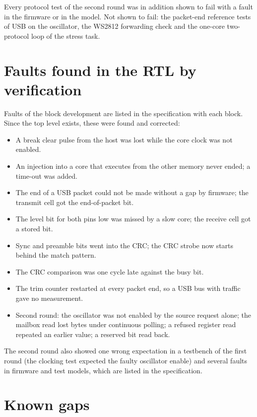 \documentclass[10pt,a4paper]{article}
\begin{document}
Every protocol test of the second round was in addition shown to fail with a fault in the firmware or in the
model. Not shown to fail: the packet-end reference tests of USB on the oscillator, the WS2812 forwarding check
and the one-core two-protocol loop of the stress task.

\section{Faults found in the RTL by verification}

Faults of the block development are listed in the specification with each block. Since the top level exists,
these were found and corrected:

\begin{itemize}
\item A break clear pulse from the host was lost while the core clock was not enabled.
\item An injection into a core that executes from the other memory never ended; a time-out was added.
\item The end of a USB packet could not be made without a gap by firmware; the transmit cell got the end-of-packet bit.
\item The level bit for both pins low was missed by a slow core; the receive cell got a stored bit.
\item Sync and preamble bits went into the CRC; the CRC strobe now starts behind the match pattern.
\item The CRC comparison was one cycle late against the busy bit.
\item The trim counter restarted at every packet end, so a USB bus with traffic gave no measurement.
\item Second round: the oscillator was not enabled by the source request alone; the mailbox read lost bytes
under continuous polling; a refused register read repeated an earlier value; a reserved bit read back.
\end{itemize}

The second round also showed one wrong expectation in a testbench of the first round (the clocking test expected
the faulty oscillator enable) and several faults in firmware and test models, which are listed in the
specification.

\section{Known gaps}
\end{document}
